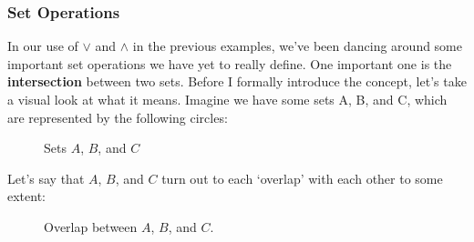 \documentclass[10pt]{article}
\theoremstyle{definition}
\begin{document}
\subsubsection{Set Operations}
In our use of $\lor$ and $\land$ in the previous examples, we've been dancing around some important set operations we have yet to really define.  One important one is the \textbf{intersection} between two sets.  Before I formally introduce the concept, let's take a visual look at what it means.  Imagine we have some sets A, B, and C, which are represented by the following circles:
\begin{figure}[H]
\centering
\def\firstcirclea{(-5,0) circle (1.5cm)}
\def\secondcirclea{(0,0) circle (1.5cm)}
\def\thirdcirclea{(5,0) circle (1.5cm)}
\caption{Sets $A$, $B$, and $C$}
\label{fig:sets}
\end{figure}
Let's say that $A$, $B$, and $C$ turn out to each `overlap' with each other to some extent:
\begin{figure}[H]
\centering
\def\firstcircle{(0,0) circle (1.5cm)}
\def\secondcircle{(60:2cm) circle (1.5cm)}
\def\thirdcircle{(0:2cm) circle (1.5cm)}
\caption{Overlap between $A$, $B$, and $C$.}
\label{fig:intersection}
\end{figure}
\end{document}

